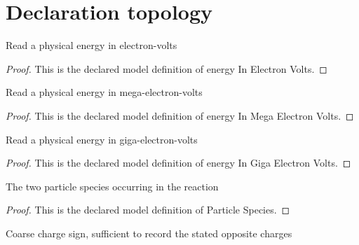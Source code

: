 \section{Declaration topology}
\begin{definition}
  \label{def:physics:phyx-mini-0555:phyxminiproblems-problemphyxmini0555-energyinelectronvolts}
  Read a physical energy in electron-volts
\end{definition}
\begin{proof}
  This is the declared model definition of energy In Electron Volts.
\end{proof}
\begin{definition}
  \label{def:physics:phyx-mini-0555:phyxminiproblems-problemphyxmini0555-energyinmegaelectronvolts}
  Read a physical energy in mega-electron-volts
\end{definition}
\begin{proof}
  This is the declared model definition of energy In Mega Electron Volts.
\end{proof}
\begin{definition}
  \label{def:physics:phyx-mini-0555:phyxminiproblems-problemphyxmini0555-energyingigaelectronvolts}
  Read a physical energy in giga-electron-volts
\end{definition}
\begin{proof}
  This is the declared model definition of energy In Giga Electron Volts.
\end{proof}
\begin{definition}
  \label{def:physics:phyx-mini-0555:phyxminiproblems-problemphyxmini0555-particlespecies}
  The two particle species occurring in the reaction
\end{definition}
\begin{proof}
  This is the declared model definition of Particle Species.
\end{proof}
\begin{definition}
  \label{def:physics:phyx-mini-0555:phyxminiproblems-problemphyxmini0555-electricchargesign}
  Coarse charge sign, sufficient to record the stated opposite charges
\end{definition}
